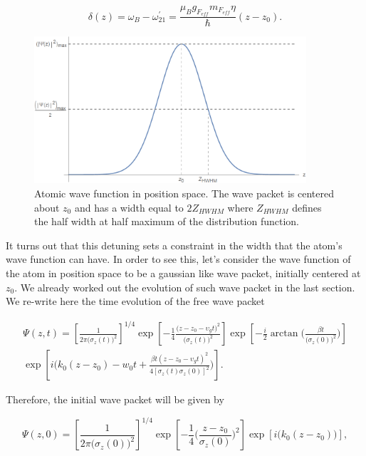 \documentclass{article}
\begin{document}
\begin{equation}\label{detunig_atom_width}
  \delta (z) = \omega_{B} - \omega_{21}^{\prime} = \frac{\mu_{B} g_{F_{eff}} m_{F_{eff}} \eta}{\hbar} (z-z_{0}).
\end{equation}

\begin{figure}
\centering
\includegraphics[width=0.9\textwidth]{atom_wave_func_pos_space.png}
\caption{Atomic wave function in position space. The wave packet is centered about $z_{0}$ and has a width equal to $2Z_{HWHM}$ where $Z_{HWHM}$ defines the half width at half maximum of the distribution function.}
\label{atom_wave_func_pos_space}
\end{figure}

It turns out that this detuning sets a constraint in the width that the atom's wave function can have. In order to see this,
let's consider the wave function of the atom in position space to be a gaussian like wave packet, initially centered at $z_{0}$. We already worked out the evolution of such wave packet in the last section. We re-write here the time evolution of the free wave packet

\begin{multline}\label{atom_wave_function_position_space}
    \Psi (z, t) = \left[\frac{1}{2 \pi \big(\sigma_{z}(t)\big)^2} \right]^{1/4} \exp \left[-\frac{1}{4} \frac{ \big(z - z_{0} - \upsilon_{g} t \big)^{2}}{\big(\sigma_{z}(t)\big)^{2}} \right] \exp \left[-\frac{i}{2} \arctan\Bigg(\frac{\beta t }{\big(\sigma_{z}(0)\big)^{2}}\Bigg) \right] \\ \exp \left[i \bigg(k_{0}(z-z_{0}) - w_{0}t + \frac{ \beta t (z - z_{0} - \upsilon_{g} t)^{2}}{ 4[\sigma_{z}(t)\sigma_{z}(0)]^{2}} \bigg) \right].
\end{multline}

Therefore, the initial wave packet will be given by

\begin{equation}\label{initial_atom_wave_function_position_space}
    \Psi (z, 0) = \left[\frac{1}{2 \pi \big(\sigma_{z}(0)\big)^2} \right]^{1/4} \exp \left[-\frac{1}{4}\bigg(\frac{z-z_{0}}{\sigma_{z}(0)}\bigg)^{2} \right] \exp \left[i \bigg(k_{0}(z-z_{0})\bigg) \right],
\end{equation}
\end{document}
